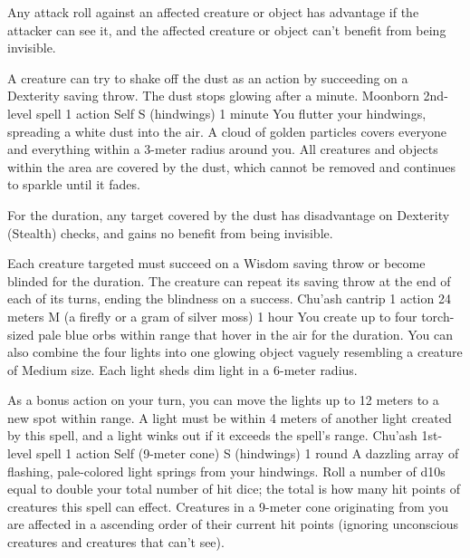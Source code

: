     Any attack roll against an affected creature or object has advantage if the attacker can see it, and the affected creature or object can't benefit from being invisible.

    A creature can try to shake off the dust as an action by succeeding on a Dexterity saving throw.
    The dust stops glowing after a minute.
    {Moonborn 2nd-level spell}
    {1 action}
    {Self}
    {S (hindwings)}
    {1 minute}
    You flutter your hindwings, spreading a white dust into the air.
    A cloud of golden particles covers everyone and everything within a 3-meter radius around you.
    All creatures and objects within the area are covered by the dust, which cannot be removed and continues to sparkle until it fades.

    For the duration, any target covered by the dust has disadvantage on Dexterity (Stealth) checks, and gains no benefit from being invisible.

    Each creature targeted must succeed on a Wisdom saving throw or become blinded for the duration.
    The creature can repeat its saving throw at the end of each of its turns, ending the blindness on a success.
    {Chu'ash cantrip}
    {1 action}
    {24 meters}
    {M (a firefly or a gram of silver moss)}
    {1 hour}
    You create up to four torch-sized pale blue orbs within range that hover in the air for the duration.
    You can also combine the four lights into one glowing object vaguely resembling a creature of Medium size.
    Each light sheds dim light in a 6-meter radius.

    As a bonus action on your turn, you can move the lights up to 12 meters to a new spot within range.
    A light must be within 4 meters of another light created by this spell, and a light winks out if it exceeds the spell's range.
    {Chu'ash 1st-level spell}
    {1 action}
    {Self (9-meter cone)}
    {S (hindwings)}
    {1 round}
    A dazzling array of flashing, pale-colored light springs from your hindwings.
    Roll a number of d10s equal to double your total number of hit dice; the total is how many hit points of creatures this spell can effect.
    Creatures in a 9-meter cone originating from you are affected in a ascending order of their current hit points (ignoring unconscious creatures and creatures that can't see).

